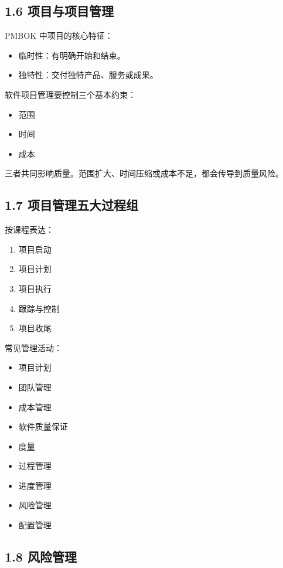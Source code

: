 \documentclass[UTF8,zihao=-4]{ctexart}
\begin{document}
\subsection{1.6 项目与项目管理}

PMBOK 中项目的核心特征：

\begin{itemize}
\item 临时性：有明确开始和结束。
\item 独特性：交付独特产品、服务或成果。
\end{itemize}

软件项目管理要控制三个基本约束：

\begin{itemize}
\item 范围
\item 时间
\item 成本
\end{itemize}

三者共同影响质量。范围扩大、时间压缩或成本不足，都会传导到质量风险。

\subsection{1.7 项目管理五大过程组}

按课程表达：

\begin{enumerate}
\item 项目启动
\item 项目计划
\item 项目执行
\item 跟踪与控制
\item 项目收尾
\end{enumerate}

常见管理活动：

\begin{itemize}
\item 项目计划
\item 团队管理
\item 成本管理
\item 软件质量保证
\item 度量
\item 过程管理
\item 进度管理
\item 风险管理
\item 配置管理
\end{itemize}

\subsection{1.8 风险管理}
\end{document}
